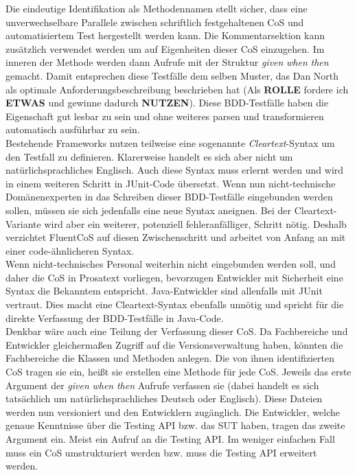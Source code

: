 Die eindeutige Identifikation als Methodennamen stellt sicher, dass eine unverwechselbare Parallele zwischen schriftlich festgehaltenen CoS und automatisiertem Test hergestellt werden kann. Die Kommentarsektion kann zusätzlich verwendet werden um auf Eigenheiten dieser CoS einzugehen. Im inneren der Methode werden dann Aufrufe mit der Struktur \textit{given} \textit{when} \textit{then} gemacht. Damit entsprechen diese Testfälle dem selben Muster, das Dan North als optimale Anforderungsbeschreibung beschrieben hat (Als \textbf{ROLLE} fordere ich \textbf{ETWAS} und gewinne dadurch \textbf{NUTZEN}). Diese BDD-Testfälle haben die Eigenschaft gut lesbar zu sein und ohne weiteres parsen und transformieren automatisch ausführbar zu sein.\\
Bestehende Frameworks nutzen teilweise eine sogenannte \textit{Cleartext}-Syntax um den Testfall zu definieren. Klarerweise handelt es sich aber nicht um natürlichsprachliches Englisch. Auch diese Syntax muss erlernt werden und wird in einem weiteren Schritt in JUnit-Code übersetzt. Wenn nun nicht-technische Domänenexperten in das Schreiben dieser BDD-Testfälle eingebunden werden sollen, müssen sie sich jedenfalls eine neue Syntax aneignen. Bei der Cleartext-Variante wird aber ein weiterer, potenziell fehleranfälliger, Schritt nötig. Deshalb verzichtet FluentCoS auf diesen Zwischenschritt und arbeitet von Anfang an mit einer code-ähnlicheren Syntax.\\
Wenn nicht-technisches Personal weiterhin nicht eingebunden werden soll, und daher die CoS in Prosatext vorliegen, bevorzugen Entwickler mit Sicherheit eine Syntax die Bekanntem entspricht. Java-Entwickler sind allenfalls mit JUnit vertraut. Dies macht eine Cleartext-Syntax ebenfalls unnötig und spricht für die direkte Verfassung der BDD-Testfälle in Java-Code.\\
Denkbar wäre auch eine Teilung der Verfassung dieser CoS. Da Fachbereiche und Entwickler gleichermaßen Zugriff auf die Versionsverwaltung haben, könnten die Fachbereiche die Klassen und Methoden anlegen. Die von ihnen identifizierten CoS tragen sie ein, heißt sie erstellen eine Methode für jede CoS. Jeweils das erste Argument der \textit{given} \textit{when} \textit{then} Aufrufe verfassen sie (dabei handelt es sich tatsächlich um natürlichsprachliches Deutsch oder Englisch). Diese Dateien werden nun versioniert und den Entwicklern zugänglich. Die Entwickler, welche genaue Kenntnisse über die Testing API bzw. das SUT haben, tragen das zweite Argument ein. Meist ein Aufruf an die Testing API. Im weniger einfachen Fall muss ein CoS umstrukturiert werden bzw. muss die Testing API erweitert werden.\\
